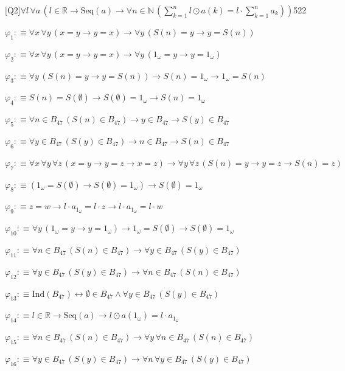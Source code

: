 \begin{fullproof}{[Q2]}{$\forall l\,\forall a\,(l \in \mathbb{R} \to \mathrm{Seq}(a) \to \forall n \in \mathbb{N}\,({\textstyle\sum_{k=1}^{n} l \odot a(k)} = l \cdot {\textstyle\sum_{k=1}^{n} a_{k}}))$}{522}
\begin{ptree}
\end{ptree}
\begin{abbrevlist}
\item $\varphi_{1} :\equiv \forall x\,\forall y\,(x = y \to y = x) \to \forall y\,(S(n) = y \to y = S(n))$
\item $\varphi_{2} :\equiv \forall x\,\forall y\,(x = y \to y = x) \to \forall y\,(1_{\omega} = y \to y = 1_{\omega})$
\item $\varphi_{3} :\equiv \forall y\,(S(n) = y \to y = S(n)) \to S(n) = 1_{\omega} \to 1_{\omega} = S(n)$
\item $\varphi_{4} :\equiv S(n) = S(\emptyset) \to S(\emptyset) = 1_{\omega} \to S(n) = 1_{\omega}$
\item $\varphi_{5} :\equiv \forall n \in B_{47}\,(S(n) \in B_{47}) \to y \in B_{47} \to S(y) \in B_{47}$
\item $\varphi_{6} :\equiv \forall y \in B_{47}\,(S(y) \in B_{47}) \to n \in B_{47} \to S(n) \in B_{47}$
\item $\varphi_{7} :\equiv \forall x\,\forall y\,\forall z\,(x = y \to y = z \to x = z) \to \forall y\,\forall z\,(S(n) = y \to y = z \to S(n) = z)$
\item $\varphi_{8} :\equiv (1_{\omega} = S(\emptyset) \to S(\emptyset) = 1_{\omega}) \to S(\emptyset) = 1_{\omega}$
\item $\varphi_{9} :\equiv z = w \to l \cdot a_{1_{\omega}} = l \cdot z \to l \cdot a_{1_{\omega}} = l \cdot w$
\item $\varphi_{10} :\equiv \forall y\,(1_{\omega} = y \to y = 1_{\omega}) \to 1_{\omega} = S(\emptyset) \to S(\emptyset) = 1_{\omega}$
\item $\varphi_{11} :\equiv \forall n \in B_{47}\,(S(n) \in B_{47}) \to \forall y \in B_{47}\,(S(y) \in B_{47})$
\item $\varphi_{12} :\equiv \forall y \in B_{47}\,(S(y) \in B_{47}) \to \forall n \in B_{47}\,(S(n) \in B_{47})$
\item $\varphi_{13} :\equiv \mathrm{Ind}(B_{47}) \leftrightarrow \emptyset \in B_{47} \land \forall y \in B_{47}\,(S(y) \in B_{47})$
\item $\varphi_{14} :\equiv l \in \mathbb{R} \to \mathrm{Seq}(a) \to l \odot a(1_{\omega}) = l \cdot a_{1_{\omega}}$
\item $\varphi_{15} :\equiv \forall n \in B_{47}\,(S(n) \in B_{47}) \to \forall y\,\forall n \in B_{47}\,(S(n) \in B_{47})$
\item $\varphi_{16} :\equiv \forall y \in B_{47}\,(S(y) \in B_{47}) \to \forall n\,\forall y \in B_{47}\,(S(y) \in B_{47})$

\end{abbrevlist}
\end{fullproof}
